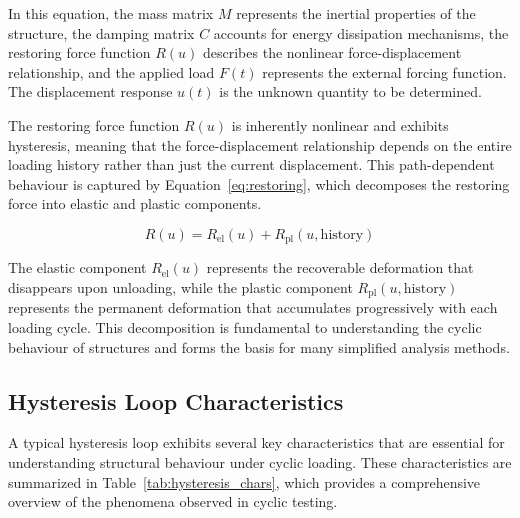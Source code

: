 \documentclass[11pt,a4paper]{article}
\begin{document}
In this equation, the mass matrix \(M\) represents the inertial properties of the structure, the damping matrix \(C\) accounts for energy dissipation mechanisms, the restoring force function \(R(u)\) describes the nonlinear force-displacement relationship, and the applied load \(F(t)\) represents the external forcing function. The displacement response \(u(t)\) is the unknown quantity to be determined.

The restoring force function \(R(u)\) is inherently nonlinear and exhibits hysteresis, meaning that the force-displacement relationship depends on the entire loading history rather than just the current displacement. This path-dependent behaviour is captured by Equation~\ref{eq:restoring}, which decomposes the restoring force into elastic and plastic components.

\begin{equation}
R(u) = R_{\text{el}}(u) + R_{\text{pl}}(u, \text{history})
\label{eq:restoring}
\end{equation}

The elastic component \(R_{\text{el}}(u)\) represents the recoverable deformation that disappears upon unloading, while the plastic component \(R_{\text{pl}}(u, \text{history})\) represents the permanent deformation that accumulates progressively with each loading cycle. This decomposition is fundamental to understanding the cyclic behaviour of structures and forms the basis for many simplified analysis methods.

\subsection{Hysteresis Loop Characteristics}

A typical hysteresis loop exhibits several key characteristics that are essential for understanding structural behaviour under cyclic loading. These characteristics are summarized in Table~\ref{tab:hysteresis_chars}, which provides a comprehensive overview of the phenomena observed in cyclic testing.
\end{document}
